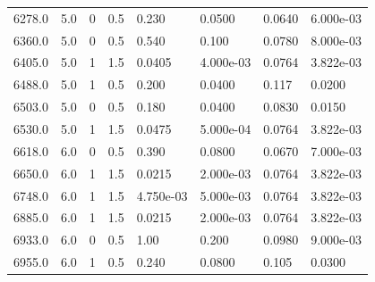 \documentclass[preview]{standalone}
\begin{document}
{{{\begin{tabular}{L{1.2cm}C{1.2cm} C{0.3cm}C{0.5cm} C{1.4cm}C{1.4cm} C{1.4cm}C{1.4cm}}
  6278.0  &   5.0  & 0     & 0.5 &  0.230  & 0.0500  & 0.0640 &  6.000e-03   \\ 
  6360.0  &   5.0  & 0     & 0.5 &  0.540  & 0.100  & 0.0780 &  8.000e-03   \\ 
  6405.0  &   5.0  & 1     & 1.5 &  0.0405  & 4.000e-03  & 0.0764 &  3.822e-03   \\ 
  6488.0  &   5.0  & 1     & 0.5 &  0.200  & 0.0400  & 0.117 &  0.0200   \\ 
  6503.0  &   5.0  & 0     & 0.5 &  0.180  & 0.0400  & 0.0830 &  0.0150   \\ 
  6530.0  &   5.0  & 1     & 1.5 &  0.0475  & 5.000e-04  & 0.0764 &  3.822e-03   \\ 
  6618.0  &   6.0  & 0     & 0.5 &  0.390  & 0.0800  & 0.0670 &  7.000e-03   \\ 
  6650.0  &   6.0  & 1     & 1.5 &  0.0215  & 2.000e-03  & 0.0764 &  3.822e-03   \\ 
  6748.0  &   6.0  & 1     & 1.5 &  4.750e-03  & 5.000e-03  & 0.0764 &  3.822e-03   \\ 
  6885.0  &   6.0  & 1     & 1.5 &  0.0215  & 2.000e-03  & 0.0764 &  3.822e-03   \\ 
  6933.0  &   6.0  & 0     & 0.5 &  1.00  & 0.200  & 0.0980 &  9.000e-03   \\ 
  6955.0  &   6.0  & 1     & 0.5 &  0.240  & 0.0800  & 0.105 &  0.0300   \\ 
\hline 
\end{tabular} 

}}}
\end{document}
